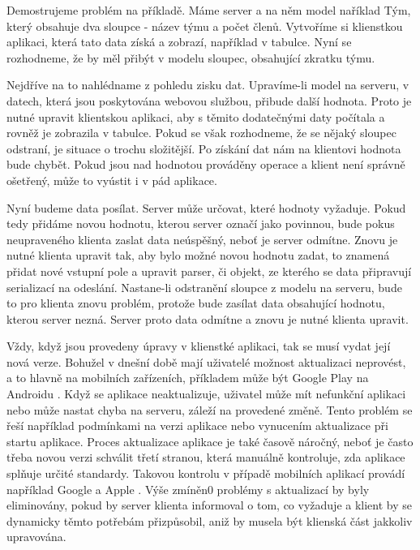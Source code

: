 Demostrujeme problém na příkladě. Máme server a na něm model naříklad Tým, který obsahuje dva sloupce - název týmu a počet členů. Vytvoříme si klienstkou aplikaci, která tato data získá a zobrazí, například v tabulce. Nyní se rozhodneme, že by měl přibýt v modelu sloupec, obsahující zkratku týmu. 

Nejdříve na to nahlédname z pohledu zisku dat. Upravíme-li model na serveru, v datech, která jsou poskytována webovou službou, přibude další hodnota. Proto je nutné upravit klientskou aplikaci, aby s těmito dodatečnými daty počítala a rovněž je zobrazila v tabulce. Pokud se však rozhodneme, že se nějaký sloupec odstraní, je situace o trochu složitější. Po získání dat nám na klientovi hodnota bude chybět. Pokud jsou nad hodnotou prováděny operace a klient není správně ošetřený, může to vyústit i v pád aplikace.

Nyní budeme data posílat. Server může určovat, které hodnoty vyžaduje. Pokud tedy přidáme novou hodnotu, kterou server označí jako povinnou, bude pokus neupraveného klienta zaslat data neúspěšný, neboť je server odmítne. Znovu je nutné klienta upravit tak, aby bylo možné novou hodnotu zadat, to znamená přidat nové vstupní pole a upravit parser, či objekt, ze kterého se data připravují serializací na odeslání. Nastane-li odstranění sloupce z modelu na serveru, bude to pro klienta znovu problém, protože bude zasílat data obsahující hodnotu, kterou server nezná. Server proto data odmítne a znovu je nutné klienta upravit. 

Vždy, když jsou provedeny úpravy v klienstké aplikaci, tak se musí vydat její nová verze. Bohužel v dnešní době mají uživatelé možnost aktualizaci neprovést, a to hlavně na mobilních zařízeních, příkladem může být Google Play na Androidu \cite{android-auto-update}. Když se aplikace neaktualizuje, uživatel může mít nefunkční aplikaci nebo může nastat chyba na serveru, záleží na provedené změně. Tento problém se řeší například podmínkami na verzi aplikace nebo vynucením aktualizace při startu aplikace. Proces aktualizace aplikace je také časově náročný, neboť je často třeba novou verzi schválit třetí stranou, která manuálně kontroluje, zda aplikace splňuje určité standardy. Takovou kontrolu v případě mobilních aplikací provádí například Google a Apple \cite{app-approval}. Výše zmíněn0 problémy s aktualizací by byly eliminovány, pokud by server klienta informoval o tom, co vyžaduje a klient by se dynamicky těmto potřebám přizpůsobil, aniž by musela být klienská část jakkoliv upravována.

